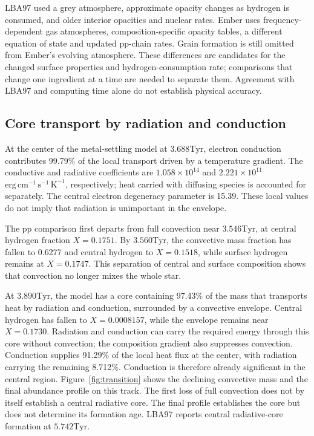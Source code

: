 \documentclass[11pt,letterpaper]{article}
\newcommand{\Tyr}{\mathrm{Tyr}}
\begin{document}
LBA97 used a grey atmosphere, approximate opacity changes as hydrogen is
consumed, and older interior opacities and nuclear rates. Ember uses
frequency-dependent gas atmospheres, composition-specific opacity tables,
a different equation of state and updated pp-chain rates. Grain formation
is still omitted from Ember's evolving atmosphere. These differences are
candidates for the changed surface properties and hydrogen-consumption rate;
comparisons that change one ingredient at a time are needed to separate them.
Agreement with LBA97 and computing time alone do not establish physical
accuracy.

\subsection{Core transport by radiation and conduction}
At the center of the metal-settling model at $3.688\Tyr$, electron
conduction contributes 99.79\% of the local transport driven by a temperature
gradient. The conductive and radiative coefficients are
$1.058\times10^{14}$ and $2.221\times10^{11}$
$\mathrm{erg\,cm^{-1}\,s^{-1}\,K^{-1}}$, respectively; heat carried with
diffusing species is accounted for separately. The central electron
degeneracy parameter is 15.39. These local values do not imply that radiation
is unimportant in the envelope.


The pp comparison first departs from full convection near $3.546\Tyr$, at central
hydrogen fraction $X=0.1751$. By $3.560\Tyr$, the convective mass fraction
has fallen to 0.6277 and central hydrogen to $X=0.1518$, while surface
hydrogen remains at $X=0.1747$. This separation of central and surface
composition shows that convection no longer mixes the whole star.

At $3.890\Tyr$, the model has a core containing 97.43\% of the mass that
transports heat by radiation and conduction, surrounded by a convective envelope.
Central hydrogen has fallen to $X=0.0008157$, while the envelope remains
near $X=0.1730$. Radiation and conduction can carry the required energy
through this core without convection; the composition gradient also suppresses
convection. Conduction supplies 91.29\% of the local heat flux at the center,
with radiation carrying the remaining 8.712\%. Conduction is therefore already
significant in the central region. Figure~\ref{fig:transition} shows
the declining convective mass and the final abundance profile on this track.
The first loss of full convection does not by itself establish a central
radiative core. The final profile establishes the core but does not determine its formation
age. LBA97 reports central
radiative-core formation at $5.742\Tyr$.
\end{document}
